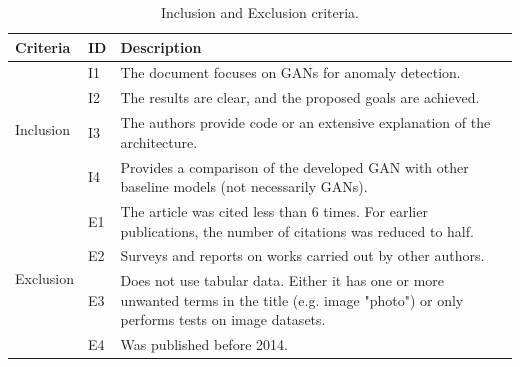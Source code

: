\begin{table}[]
\caption{Inclusion and Exclusion criteria.}
\label{tab:criteria}
\begin{tabularx}{\textwidth}{@{}llX@{}}
\hline
\textbf{Criteria}                                       & \textbf{ID} & \textbf{Description}                                                                                                                                     \\ \midrule
\multirow{4}{*}{Inclusion}                     & I1 & The document focuses on GANs for anomaly detection.                                                                                             \\
                                               & I2 & The results are clear, and the proposed goals are achieved.                                                                                     \\
                                               & I3 & The authors provide code or an extensive explanation of the architecture.                                                                       \\
                                               & I4 & Provides a comparison of the developed GAN with other baseline models (not necessarily GANs).                                                   \\ \midrule
\multicolumn{1}{c}{\multirow{4}{*}{Exclusion}} & E1 & The article was cited less than 6 times. For earlier publications, the number of citations was reduced to half.                                 \\
\multicolumn{1}{c}{}                           & E2 & Surveys and reports on works carried out by other authors.                                                                                      \\
\multicolumn{1}{c}{}                           & E3 & Does not use tabular data. Either it has one or more unwanted terms in the title (e.g. image "photo") or only performs tests on image datasets. \\
\multicolumn{1}{c}{}                           & E4 & Was published before 2014. \\\hline                                                                                                                    
\end{tabularx}
\end{table}

